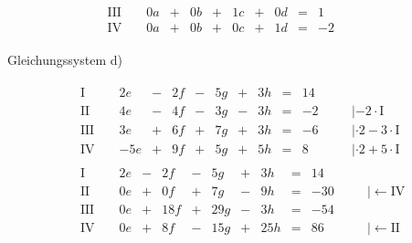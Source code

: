 \begin{exercise}
\begin{minipage}[t]{0.49\linewidth}
\begin{align*}
\begin{array}{r|rrrrrrrrrrrl}
        \text{III}{\,} & {\,} & \num{0}a & + & \num{0}b & + & \num{1}c & + & \num{0}d & = &  \num{1} & {\quad} &   \\
         \text{IV}{\,} & {\,} & \num{0}a & + & \num{0}b & + & \num{0}c & + & \num{1}d & = & -\num{2} & {\quad} &
        \end{array}
        \end{align*}
      \end{minipage}%
    \endgroup
    \enlargethispage{4\baselineskip}%
    \bigskip\par Gleichungssystem d)\par
    \begingroup
      \footnotesize
      \setlength{\arraycolsep}{1pt}%
      \begin{minipage}[t]{0.49\linewidth}
        \vspace*{-\abovedisplayskip}
        \begin{align*}
        &
        \begin{array}{r|rrrrrrrrrrrl}
          \text{I}{\,} & {\,} &  \num{2}e & - & \num{2}f & - & \num{5}g & + & \num{3}h & = & \num{14} & {\quad} &                                    \\
         \text{II}{\,} & {\,} &  \num{4}e & - & \num{4}f & - & \num{3}g & - & \num{3}h & = & -\num{2} & {\quad} & |-\num{2}\cdot\text{I}             \\
        \text{III}{\,} & {\,} &  \num{3}e & + & \num{6}f & + & \num{7}g & + & \num{3}h & = & -\num{6} & {\quad} & |\cdot\num{2}-\num{3}\cdot\text{I} \\
         \text{IV}{\,} & {\,} & -\num{5}e & + & \num{9}f & + & \num{5}g & + & \num{5}h & = &  \num{8} & {\quad} & |\cdot\num{2}+\num{5}\cdot\text{I}
        \end{array}
        \\[1ex]&
        \begin{array}{r|rrrrrrrrrrrl}
          \text{I}{\,} & {\,} & \num{2}e & - &  \num{2}f & - &  \num{5}g & + &  \num{3}h & = &  \num{14} & {\quad} &                      \\
         \text{II}{\,} & {\,} & \num{0}e & + &  \num{0}f & + &  \num{7}g & - &  \num{9}h & = & -\num{30} & {\quad} & |\leftarrow\text{IV} \\
        \text{III}{\,} & {\,} & \num{0}e & + & \num{18}f & + & \num{29}g & - &  \num{3}h & = & -\num{54} & {\quad} &                      \\
         \text{IV}{\,} & {\,} & \num{0}e & + &  \num{8}f & - & \num{15}g & + & \num{25}h & = &  \num{86} & {\quad} & |\leftarrow\text{II}

\end{array}
\end{align*}
\end{minipage}
\end{exercise}
